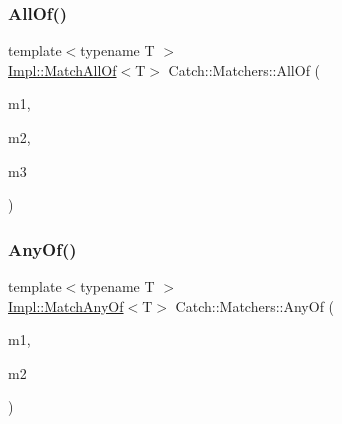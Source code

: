 \subsubsection{\texorpdfstring{All\+Of()}{AllOf()}\hspace{0.1cm}{\footnotesize\ttfamily [2/2]}}
{\footnotesize\ttfamily template$<$typename T $>$ \\
\hyperlink{struct_catch_1_1_matchers_1_1_impl_1_1_match_all_of}{Impl\+::\+Match\+All\+Of}$<$T$>$ Catch\+::\+Matchers\+::\+All\+Of (\begin{DoxyParamCaption}\item[{\hyperlink{struct_catch_1_1_matchers_1_1_impl_1_1_matcher_base}{Impl\+::\+Matcher\+Base}$<$ T $>$ const \&}]{m1,  }\item[{\hyperlink{struct_catch_1_1_matchers_1_1_impl_1_1_matcher_base}{Impl\+::\+Matcher\+Base}$<$ T $>$ const \&}]{m2,  }\item[{\hyperlink{struct_catch_1_1_matchers_1_1_impl_1_1_matcher_base}{Impl\+::\+Matcher\+Base}$<$ T $>$ const \&}]{m3 }\end{DoxyParamCaption})\hspace{0.3cm}{\ttfamily [inline]}}

\mbox{\label{namespace_catch_1_1_matchers_a07f8680aede448d54661b9ebc111ecad}} 
\subsubsection{\texorpdfstring{Any\+Of()}{AnyOf()}\hspace{0.1cm}{\footnotesize\ttfamily [1/2]}}
{\footnotesize\ttfamily template$<$typename T $>$ \\
\hyperlink{struct_catch_1_1_matchers_1_1_impl_1_1_match_any_of}{Impl\+::\+Match\+Any\+Of}$<$T$>$ Catch\+::\+Matchers\+::\+Any\+Of (\begin{DoxyParamCaption}\item[{\hyperlink{struct_catch_1_1_matchers_1_1_impl_1_1_matcher_base}{Impl\+::\+Matcher\+Base}$<$ T $>$ const \&}]{m1,  }\item[{\hyperlink{struct_catch_1_1_matchers_1_1_impl_1_1_matcher_base}{Impl\+::\+Matcher\+Base}$<$ T $>$ const \&}]{m2 }\end{DoxyParamCaption})\hspace{0.3cm}{\ttfamily [inline]}}

